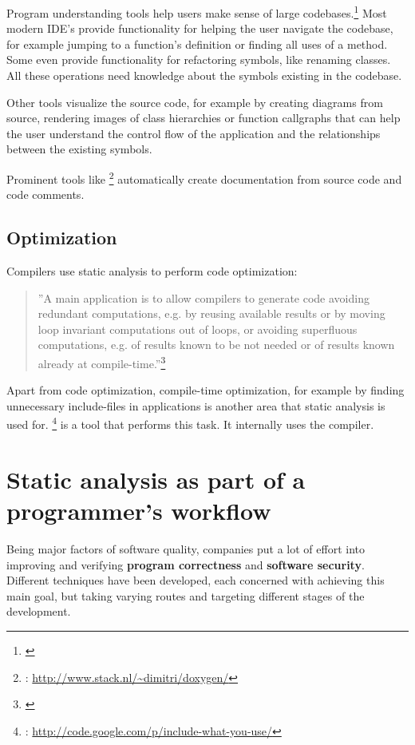 Program understanding tools help users make sense of large codebases.\footnote{\citep[27]{SecureProgramming}} Most modern IDE's provide functionality for helping the user navigate the codebase, for example jumping to a function's definition or finding all uses of a method. Some even provide functionality for refactoring symbols, like renaming classes. All these operations need knowledge about the symbols existing in the codebase.

Other tools visualize the source code, for example by creating  diagrams from source, rendering images of class hierarchies or function callgraphs that can help the user understand the control flow of the application and the relationships between the existing symbols.

Prominent tools like \footnote{: \url{http://www.stack.nl/~dimitri/doxygen/}} automatically create documentation from source code and code comments.

\subsection{Optimization}

Compilers use static analysis to perform code optimization:

\begin{quotation}
''A main application is to allow compilers to generate code avoiding redundant computations, e.g. by reusing available results or by moving loop invariant computations out of loops, or avoiding superfluous computations, e.g. of results known to be not needed or of results known already at compile-time.''\footnote{\citep[1]{ProgramAnalysis}}
\end{quotation}

Apart from code optimization, compile-time optimization, for example by finding unnecessary include-files in  applications is another area that static analysis is used for. \footnote{: \url{http://code.google.com/p/include-what-you-use/}} is a tool that performs this task. It internally uses the  compiler.

\section{Static analysis as part of a programmer's workflow}

Being major factors of software quality, companies put a lot of effort into improving and verifying \textbf{program correctness} and \textbf{software security}. Different techniques have been developed, each concerned with achieving this main goal, but taking varying routes and targeting different stages of the development.

